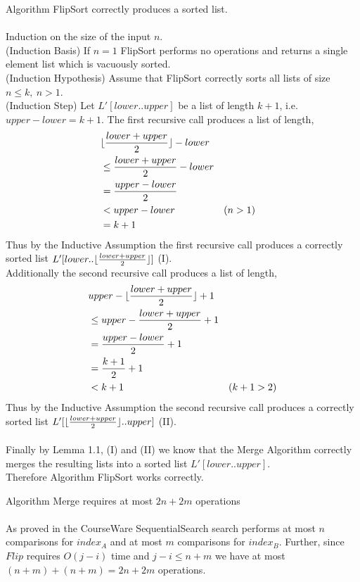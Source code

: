 \documentclass[12pt]{article}
\newenvironment{lemma}[2][Lemma]{\begin{trivlist}
\item[\hskip \labelsep {\bfseries #1}\hskip \labelsep {\bfseries #2.}]}{\end{trivlist}}
\newenvironment{question}[2][Question]{\begin{trivlist}
\item[\hskip \labelsep {\bfseries #1}\hskip \labelsep {\bfseries #2.}]}{\end{trivlist}}
\DeclarePairedDelimiter{\floor}{\lfloor}{\rfloor}
\begin{document}
\begin{question}{1 (a)}
  \begin{lemma}{1.2} Algorithm FlipSort correctly produces a sorted list.
    \leavevmode \\ \\
    Induction on the size of the input $n$.\\
    (Induction Basis) If $n=1$ FlipSort performs no operations and returns a
    single element list which is vacuously sorted.\\
    (Induction Hypothesis) Assume that FlipSort correctly sorts all lists of size $n \leq k,\ n > 1$. \\
    (Induction Step) Let $L'[lower..upper]$ be a list of length $k + 1$, i.e.
    $upper - lower = k + 1$.  The first recursive call produces a list of length,
    \begin{align*}
       & \floor{\frac{lower + upper}{2}} - lower &\\
       & \leq \frac{lower + upper}{2} - lower & \\
       & = \frac{upper-lower}{2} & \\
       & < upper - lower & (n > 1) & \\
       & = k + 1 &
    \end{align*}
    Thus by the Inductive Assumption the first recursive call produces a correctly
    sorted list $L'[lower..\floor{\frac{lower + upper}{2}}]$ (I).\\
    Additionally the second recursive call produces a list of length,
    \begin{align*}
      & upper  - \floor{\frac{lower + upper}{2}} + 1 & \\
      & \leq upper - \frac{lower + upper}{2} + 1 & \\
      & = \frac{upper - lower}{2} + 1 &\\
      & = \frac{k + 1}{2} + 1 &\\
      & < k + 1 & (k + 1 > 2)
    \end{align*}
    Thus by the Inductive Assumption the second recursive call produces a correctly
    sorted list $L'[\floor{\frac{lower + upper}{2}}..upper]$ (II). \\ \\
    Finally by Lemma 1.1, (I) and (II) we know that the Merge Algorithm correctly
    merges the resulting lists into a sorted list $L'[lower..upper]$.\\
    Therefore Algorithm FlipSort works correctly.
  \end{lemma}

  \begin{lemma}{1.3} Algorithm Merge requires at most $2n + 2m$ operations \\ \\
    As proved in the CourseWare SequentialSearch search performs at most $n$
    comparisons for $index_{A}$ and at most $m$ comparisons for $index_{B}$.
    Further, since $Flip$ requires $O(j - i)$ time and $j - i \leq n + m$ we
    have at most $(n + m) + (n + m) = 2n + 2m$ operations.
  \end{lemma}


\end{question}
\end{document}
